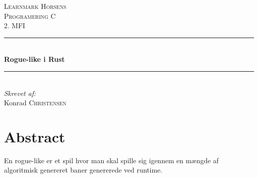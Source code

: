 \documentclass[12pt]{article}
\begin{document}
\begin{titlepage}

	\newcommand{\HRule}{\rule{\linewidth}{0.5mm}}

	\center


	\textsc{\LARGE Learnmark Horsens}\\[1.5cm] %
	\textsc{\Large Programering C}\\[0.5cm] %
	\textsc{\large 2. MFI}\\[0.5cm] %


	\HRule \\[0.4cm]
	{ \huge \bfseries Rogue-like i Rust}\\[0.4cm]
	\HRule \\[1.5cm]


	\Large \emph{Skrevet af:}\\
	Konrad \textsc{Christensen}\\[3cm]

	\vfill

\end{titlepage}

\pagebreak


\tableofcontents

\vfill

\pagebreak


\section{Abstract}
En rogue-like er et spil hvor man skal spille sig igennem en m\ae ngde af algoritmisk genereret baner genererede ved runtime.
\end{document}
